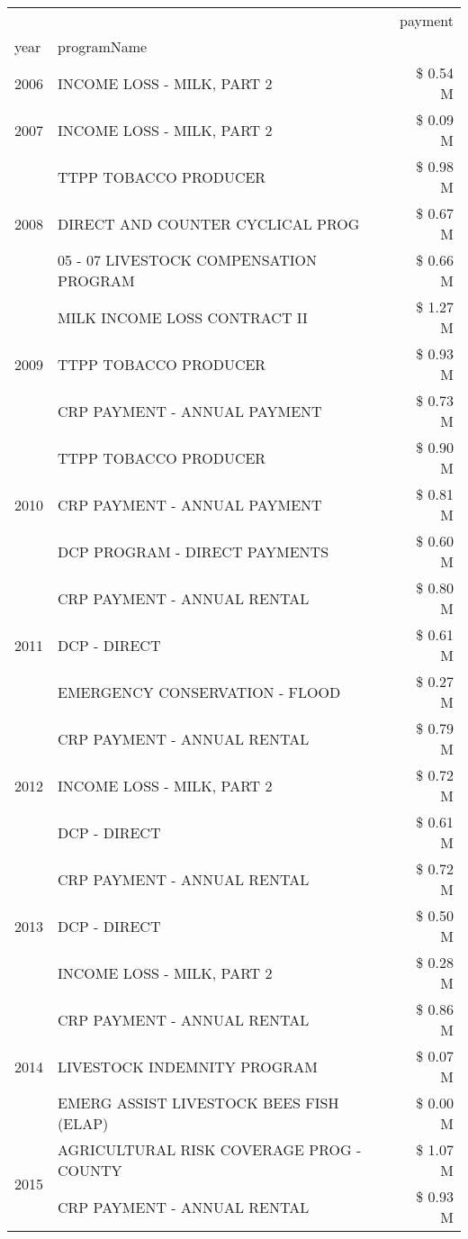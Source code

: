 \begin{tabular}{llr}
\toprule
 &  & payment \\
year & programName &  \\
\midrule
2006 & INCOME LOSS - MILK, PART 2 & \$ 0.54 M \\
\cline{1-3}
2007 & INCOME LOSS - MILK, PART 2 & \$ 0.09 M \\
\cline{1-3}
\multirow[t]{3}{*}{2008} & TTPP TOBACCO PRODUCER & \$ 0.98 M \\
 & DIRECT AND COUNTER CYCLICAL PROG & \$ 0.67 M \\
 & 05 - 07 LIVESTOCK COMPENSATION PROGRAM & \$ 0.66 M \\
\cline{1-3}
\multirow[t]{3}{*}{2009} & MILK INCOME LOSS CONTRACT II & \$ 1.27 M \\
 & TTPP TOBACCO PRODUCER & \$ 0.93 M \\
 & CRP PAYMENT - ANNUAL PAYMENT & \$ 0.73 M \\
\cline{1-3}
\multirow[t]{3}{*}{2010} & TTPP TOBACCO PRODUCER & \$ 0.90 M \\
 & CRP PAYMENT - ANNUAL PAYMENT & \$ 0.81 M \\
 & DCP PROGRAM - DIRECT PAYMENTS & \$ 0.60 M \\
\cline{1-3}
\multirow[t]{3}{*}{2011} & CRP PAYMENT - ANNUAL RENTAL & \$ 0.80 M \\
 & DCP - DIRECT & \$ 0.61 M \\
 & EMERGENCY CONSERVATION - FLOOD & \$ 0.27 M \\
\cline{1-3}
\multirow[t]{3}{*}{2012} & CRP PAYMENT - ANNUAL RENTAL & \$ 0.79 M \\
 & INCOME LOSS - MILK, PART 2 & \$ 0.72 M \\
 & DCP - DIRECT & \$ 0.61 M \\
\cline{1-3}
\multirow[t]{3}{*}{2013} & CRP PAYMENT - ANNUAL RENTAL & \$ 0.72 M \\
 & DCP - DIRECT & \$ 0.50 M \\
 & INCOME LOSS - MILK, PART 2 & \$ 0.28 M \\
\cline{1-3}
\multirow[t]{3}{*}{2014} & CRP PAYMENT - ANNUAL RENTAL & \$ 0.86 M \\
 & LIVESTOCK INDEMNITY PROGRAM & \$ 0.07 M \\
 & EMERG ASSIST LIVESTOCK BEES FISH (ELAP) & \$ 0.00 M \\
\cline{1-3}
\multirow[t]{3}{*}{2015} & AGRICULTURAL RISK COVERAGE PROG - COUNTY & \$ 1.07 M \\
 & CRP PAYMENT - ANNUAL RENTAL & \$ 0.93 M \\

\end{tabular}
